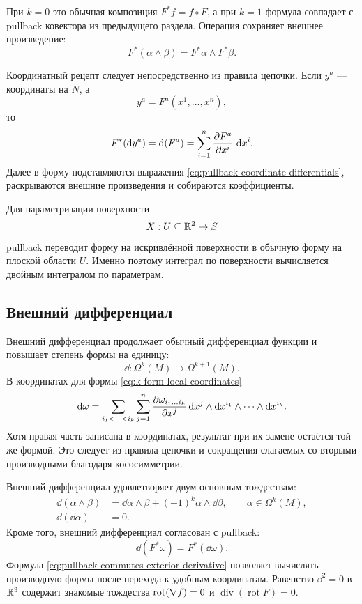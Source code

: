 При \(k=0\) это обычная композиция \(F^*f=f\circ F\), а при \(k=1\) формула совпадает с pullback ковектора из предыдущего раздела. Операция сохраняет внешнее произведение:
\begin{equation}
\label{eq:pullback-preserves-wedge}
F^*(\alpha\wedge\beta)
=F^*\alpha\wedge F^*\beta.
\end{equation}

Координатный рецепт следует непосредственно из правила цепочки. Если \(y^a\) --- координаты на \(N\), а
\[
y^a=F^a(x^1,\ldots,x^n),
\]
то
\begin{equation}
\label{eq:pullback-coordinate-differentials}
F^*(\mathop{}\!\mathrm{d} y^a)
=\mathop{}\!\mathrm{d}(F^a)
=
\sum_{i=1}^n\frac{\partial F^a}{\partial x^i}\,\mathop{}\!\mathrm{d} x^i.
\end{equation}
Далее в форму подставляются выражения \eqref{eq:pullback-coordinate-differentials}, раскрываются внешние произведения и собираются коэффициенты.

Для параметризации поверхности
\[
X:U\subseteq\mathbb{R}^2\to S
\]
pullback переводит форму на искривлённой поверхности в обычную форму на плоской области \(U\). Именно поэтому интеграл по поверхности вычисляется двойным интегралом по параметрам.

\subsection{Внешний дифференциал}

Внешний дифференциал продолжает обычный дифференциал функции и повышает степень формы на единицу:
\[
\dd:\Omega^k(M)\to\Omega^{k+1}(M).
\]
В координатах для формы \eqref{eq:k-form-local-coordinates}
\begin{equation}
\label{eq:exterior-derivative-manifold-coordinates}
\mathop{}\!\mathrm{d}\omega
=
\sum_{i_1<\cdots<i_k}
\sum_{j=1}^n
\frac{\partial \omega_{i_1\ldots i_k}}{\partial x^j}
\mathop{}\!\mathrm{d} x^j\wedge\mathop{}\!\mathrm{d} x^{i_1}\wedge\cdots\wedge\mathop{}\!\mathrm{d} x^{i_k}.
\end{equation}
Хотя правая часть записана в координатах, результат при их замене остаётся той же формой. Это следует из правила цепочки и сокращения слагаемых со вторыми производными благодаря кососимметрии.

Внешний дифференциал удовлетворяет двум основным тождествам:
\begin{align}
\label{eq:exterior-derivative-leibniz-manifold}
\dd(\alpha\wedge\beta)
&=
\dd\alpha\wedge\beta
+(-1)^k\alpha\wedge\dd\beta,
\qquad \alpha\in\Omega^k(M),\\
\label{eq:exterior-derivative-square-zero-manifold}
\dd(\dd\alpha)&=0.
\end{align}
Кроме того, внешний дифференциал согласован с pullback:
\begin{equation}
\label{eq:pullback-commutes-exterior-derivative}
\dd(F^*\omega)=F^*(\dd\omega).
\end{equation}
Формула \eqref{eq:pullback-commutes-exterior-derivative} позволяет вычислять производную формы после перехода к удобным координатам. Равенство \(\dd^2=0\) в \(\mathbb{R}^3\) содержит знакомые тождества \(\operatorname{rot}(\nabla f)=0\) и \(\operatorname{div}(\operatorname{rot}F)=0\).


